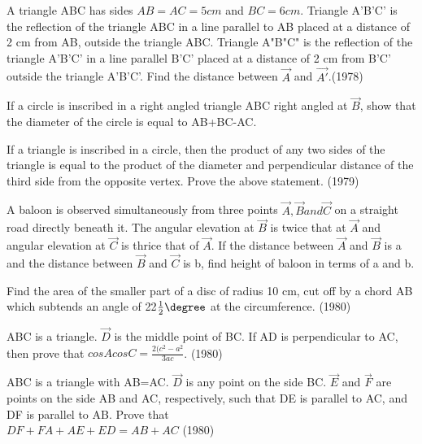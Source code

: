 \iffalse
\title{Properties of Triangles}
\author{EE24Btech11022 - Eshan sharma}
\section{subjective}
\fi
     \item A triangle ABC has sides $AB=AC=5 cm$ and $BC =6 cm$. Triangle A'B'C' is the reflection of the triangle ABC in a line parallel to AB placed at a distance of 2 cm from AB, outside the triangle ABC. Triangle A"B"C" is the reflection of the triangle A'B'C' in a line parallel B'C' placed at a distance of 2 cm from B'C' outside the triangle A'B'C'. Find the distance between $\vec{A}$ and $\vec{A'}$.\hfill {(1978)}
    \item If a circle is inscribed in a right angled triangle ABC right angled at $\vec{B}$, show that the diameter of the circle is equal to AB+BC-AC.
    \item If a triangle is inscribed in a circle, then the product of any two sides of the triangle is equal to the product of the diameter and perpendicular distance of the third side from the opposite vertex. Prove the above statement.
    \hfill {(1979)}
    \item A baloon is observed simultaneously from three points $\vec{A},\vec{B} and \vec{C}$ on a straight road directly beneath it. The angular elevation at $\vec{B}$ is twice that at $\vec{A}$ and angular elevation at $\vec{C}$ is thrice that of $\vec{A}$. If the distance between $\vec{A}$ and $\vec{B}$ is a and the distance between $\vec{B}$ and $\vec{C}$ is b, find height of baloon in terms of a and b.
    \item Find the area of the smaller part of a disc of radius 10 cm, cut off by a chord AB which subtends an angle of 22$\frac{1}{2} \degree$ at the circumference.
    \hfill {(1980)}
    \item ABC is a triangle. $\vec{D}$ is the middle point of BC. If AD is perpendicular to AC, then prove that $cosAcosC = \frac{2(c^{2}-a^{2}}{3ac}$.
    \hfill {(1980)}
    \item ABC is a triangle with AB=AC. $\vec{D}$ is any point on the side BC. $\vec{E}$ and $\vec{F}$ are points on the side AB and AC, respectively, such that DE is parallel to AC, and DF is parallel to AB. Prove that \\
    $DF + FA + AE + ED = AB+AC$
    \hfill {(1980)} 
